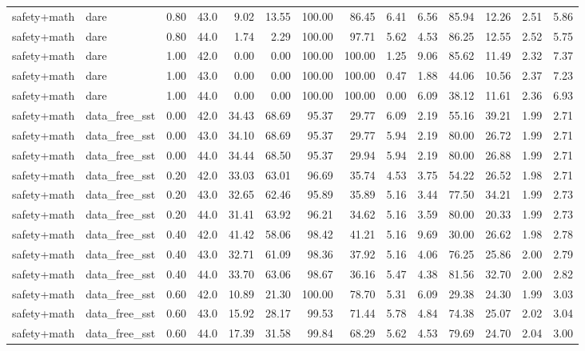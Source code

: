 \documentclass{article}
\begin{document}
\begin{table}[H]
{\begin{tabular}{llllrrrrrrrrrr}
safety+math & dare & 0.80 & 43.0 & 9.02 & 13.55 & 100.00 & 86.45 & 6.41 & 6.56 & 85.94 & 12.26 & 2.51 & 5.86 \\
safety+math & dare & 0.80 & 44.0 & 1.74 & 2.29 & 100.00 & 97.71 & 5.62 & 4.53 & 86.25 & 12.55 & 2.52 & 5.75 \\
safety+math & dare & 1.00 & 42.0 & 0.00 & 0.00 & 100.00 & 100.00 & 1.25 & 9.06 & 85.62 & 11.49 & 2.32 & 7.37 \\
safety+math & dare & 1.00 & 43.0 & 0.00 & 0.00 & 100.00 & 100.00 & 0.47 & 1.88 & 44.06 & 10.56 & 2.37 & 7.23 \\
safety+math & dare & 1.00 & 44.0 & 0.00 & 0.00 & 100.00 & 100.00 & 0.00 & 6.09 & 38.12 & 11.61 & 2.36 & 6.93 \\
safety+math & data\_free\_sst & 0.00 & 42.0 & 34.43 & 68.69 & 95.37 & 29.77 & 6.09 & 2.19 & 55.16 & 39.21 & 1.99 & 2.71 \\
safety+math & data\_free\_sst & 0.00 & 43.0 & 34.10 & 68.69 & 95.37 & 29.77 & 5.94 & 2.19 & 80.00 & 26.72 & 1.99 & 2.71 \\
safety+math & data\_free\_sst & 0.00 & 44.0 & 34.44 & 68.50 & 95.37 & 29.94 & 5.94 & 2.19 & 80.00 & 26.88 & 1.99 & 2.71 \\
safety+math & data\_free\_sst & 0.20 & 42.0 & 33.03 & 63.01 & 96.69 & 35.74 & 4.53 & 3.75 & 54.22 & 26.52 & 1.98 & 2.71 \\
safety+math & data\_free\_sst & 0.20 & 43.0 & 32.65 & 62.46 & 95.89 & 35.89 & 5.16 & 3.44 & 77.50 & 34.21 & 1.99 & 2.73 \\
safety+math & data\_free\_sst & 0.20 & 44.0 & 31.41 & 63.92 & 96.21 & 34.62 & 5.16 & 3.59 & 80.00 & 20.33 & 1.99 & 2.73 \\
safety+math & data\_free\_sst & 0.40 & 42.0 & 41.42 & 58.06 & 98.42 & 41.21 & 5.16 & 9.69 & 30.00 & 26.62 & 1.98 & 2.78 \\
safety+math & data\_free\_sst & 0.40 & 43.0 & 32.71 & 61.09 & 98.36 & 37.92 & 5.16 & 4.06 & 76.25 & 25.86 & 2.00 & 2.79 \\
safety+math & data\_free\_sst & 0.40 & 44.0 & 33.70 & 63.06 & 98.67 & 36.16 & 5.47 & 4.38 & 81.56 & 32.70 & 2.00 & 2.82 \\
safety+math & data\_free\_sst & 0.60 & 42.0 & 10.89 & 21.30 & 100.00 & 78.70 & 5.31 & 6.09 & 29.38 & 24.30 & 1.99 & 3.03 \\
safety+math & data\_free\_sst & 0.60 & 43.0 & 15.92 & 28.17 & 99.53 & 71.44 & 5.78 & 4.84 & 74.38 & 25.07 & 2.02 & 3.04 \\
safety+math & data\_free\_sst & 0.60 & 44.0 & 17.39 & 31.58 & 99.84 & 68.29 & 5.62 & 4.53 & 79.69 & 24.70 & 2.04 & 3.00 \\

\end{tabular}}
\end{table}
\end{document}
